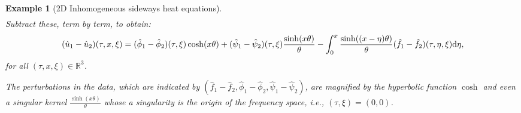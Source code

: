 \documentclass[oneside,11pt]{book}
\numberwithin{equation}{section}
\newtheorem{example}{Example}[section]
\begin{document}
\begin{example}[2D Inhomogeneous sideways heat equations]
\begin{align*}
    \end{align*}
    Subtract these, term by term, to obtain:
    \begin{align*}
        (\hat{u}_1 - \hat{u}_2)(\tau,x,\xi) = (\hat{\phi}_1 - \hat{\phi}_2)(\tau,\xi)\cosh(x\theta) + (\hat{\psi}_1 - \hat{\psi}_2)(\tau,\xi)\frac{\sinh(x\theta)}{\theta} - \int_0^x \frac{\sinh((x - \eta)\theta)}{\theta}(\hat{f}_1 - \hat{f}_2)(\tau,\eta,\xi){\rm d}\eta,
    \end{align*}
    for all $(\tau,x,\xi)\in\mathbb{R}^3$.
    
    The perturbations in the data, which are indicated by $(\hat{f}_1 - \hat{f}_2,\hat{\phi}_1 - \hat{\phi}_2,\hat{\psi}_1 - \hat{\psi}_2)$, are magnified by the hyperbolic function $\cosh$ and even a singular kernel $\frac{\sinh(x\theta)}{\theta}$ whose a singularity is the origin of the frequency space, i.e., $(\tau,\xi) = (0,0)$.
    

\end{example}
\end{document}
